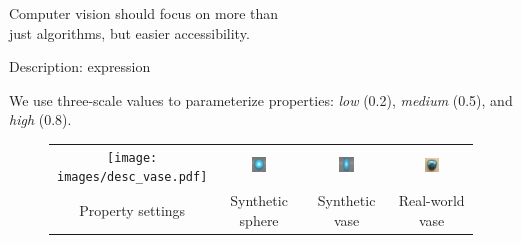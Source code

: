 \documentclass[10pt]{beamer}
\begin{document}
\begin{frame}[standout]

Computer vision should focus on more than \\just algorithms, but easier accessibility.

\end{frame}

\begin{frame}{Description: expression}

We use three-scale values to parameterize properties: \textit{low} (0.2), \textit{medium} (0.5), and \textit{high} (0.8).

\begin{figure}[!htbp]
\centering
\begin{tabular}{cccc}
  \texttt{[image: images/desc\_vase.pdf]}&
  \includegraphics[width=0.2\textwidth]{interp/ui/ui_sphere.png}&
  \includegraphics[width=0.2\textwidth]{interp/ui/ui_vase.png}&
  \includegraphics[width=0.2\textwidth]{interp/real_world_img/vase/vase.jpg}\\
  Property settings & Synthetic sphere & Synthetic vase & Real-world vase\\
\end{tabular}
\end{figure}

\end{frame}
\end{document}

